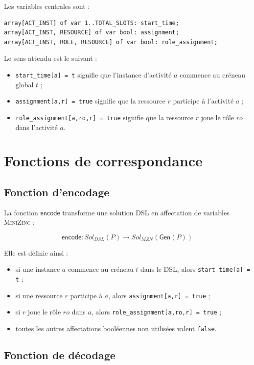 \documentclass[12pt,a4paper]{article}
\newcommand{\MZN}{\textsc{MiniZinc}}
\newcommand{\encode}{\mathsf{encode}}
\newcommand{\gen}{\mathsf{Gen}}
\begin{document}
Les variables centrales sont :

\begin{lstlisting}[language=MiniZinc]
array[ACT_INST] of var 1..TOTAL_SLOTS: start_time;
array[ACT_INST, RESOURCE] of var bool: assignment;
array[ACT_INST, ROLE, RESOURCE] of var bool: role_assignment;
\end{lstlisting}

Le sens attendu est le suivant :

\begin{itemize}[leftmargin=1.2cm]
  \item \texttt{start\_time[a] = t} signifie que l'instance d'activité $a$ commence au créneau global $t$ ;
  \item \texttt{assignment[a,r] = true} signifie que la ressource $r$ participe à l'activité $a$ ;
  \item \texttt{role\_assignment[a,ro,r] = true} signifie que la ressource $r$ joue le rôle $ro$ dans l'activité $a$.
\end{itemize}

\section{Fonctions de correspondance}

\subsection{Fonction d'encodage}

La fonction $\encode$ transforme une solution DSL en affectation de variables \MZN{} :

\[
\encode : Sol_{DSL}(P) \longrightarrow Sol_{MZN}(\gen(P))
\]

Elle est définie ainsi :

\begin{itemize}[leftmargin=1.2cm]
  \item si une instance $a$ commence au créneau $t$ dans le DSL, alors \texttt{start\_time[a] = t} ;
  \item si une ressource $r$ participe à $a$, alors \texttt{assignment[a,r] = true} ;
  \item si $r$ joue le rôle $ro$ dans $a$, alors \texttt{role\_assignment[a,ro,r] = true} ;
  \item toutes les autres affectations booléennes non utilisées valent \texttt{false}.
\end{itemize}

\subsection{Fonction de décodage}
\end{document}
